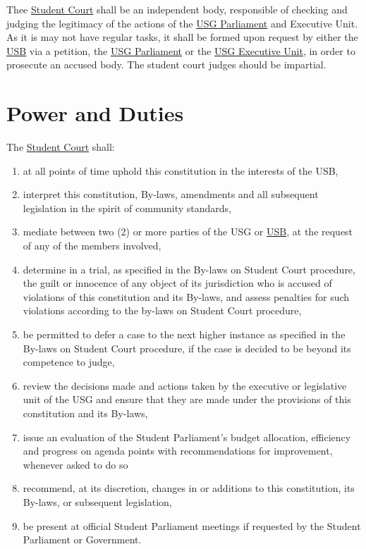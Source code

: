 \label{StudentCourtDef}
Thee \hyperref[StudentCourtDef]{Student Court} shall be an independent body, responsible of checking and judging the legitimacy of the actions of the \hyperref[USGParliamentDef]{USG Parliament} and Executive Unit. As it is may not have regular tasks, it shall be formed upon request by either the \hyperref[studentbody]{USB} via a petition, the \hyperref[USGParliamentDef]{USG Parliament} or the \hyperref[USGexecutiveUnitDef]{USG Executive Unit}, in order to prosecute an accused body. The student court judges should be impartial.

\label{art:judicative}
	\section{Power and Duties}
	The \hyperref[StudentCourtDef]{Student Court} shall:
	\protect\begin{enumerate}
		\item at all points of time uphold this constitution in the interests of the USB,
		\item interpret this constitution, By-laws, amendments and all subsequent legislation in the spirit of community standards,
		\item mediate between two (2) or more parties of the USG or \hyperref[studentbody]{USB}, at the request of any of
		the members involved,
		\item determine in a trial, as specified in the By-laws on Student Court procedure, the guilt or
		innocence of any object of its jurisdiction who is accused of violations of this constitution
		and its By-laws, and assess penalties for such violations according to the by-laws on
		Student Court procedure,
		\item  be permitted to defer a case to the next higher instance as specified in the By-laws on
		Student Court procedure, if the case is decided to be beyond its competence to judge,
		\item review the decisions made and actions taken by the executive or legislative unit of the USG and ensure that they are made under the provisions of this constitution and its By-laws,
		\item issue an evaluation of the Student Parliament's budget allocation, efficiency and progress on agenda points with recommendations for improvement, whenever asked to do so
		\item recommend, at its discretion, changes in or additions to this constitution, its By-laws, or subsequent legislation,
		\item be present at official Student Parliament meetings if requested by the Student Parliament
		or Government. 
	\end{enumerate}

